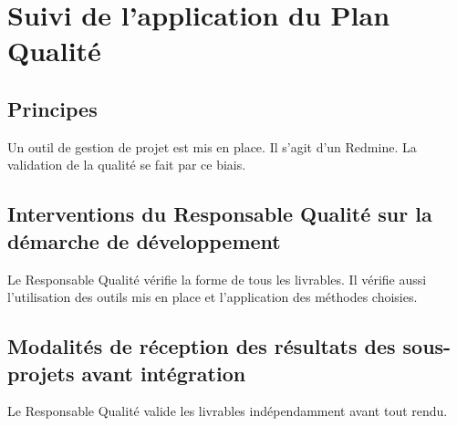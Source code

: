 \section{Suivi de l'application du Plan Qualité}

\subsection{Principes}
Un outil de gestion de projet est mis en place. Il s'agit d'un Redmine.
La validation de la qualité se fait par ce biais.

\subsection{Interventions du Responsable Qualité sur la démarche de développement}
Le Responsable Qualité vérifie la forme de tous les livrables. Il vérifie aussi l'utilisation des outils mis en place
et l'application des méthodes choisies.

\subsection{Modalités de réception des résultats des sous-projets avant intégration}
Le Responsable Qualité valide les livrables indépendamment avant tout rendu.

\pagebreak
